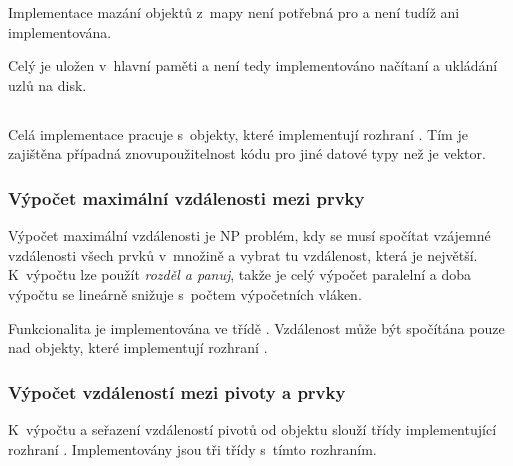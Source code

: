 Implementace mazání objektů z~mapy není potřebná pro \MIndex{} a není tudíž ani implementována.

Celý \BPTree{} je uložen v~hlavní paměti a není tedy implementováno načítaní a ukládání uzlů na disk.

\subsection{\MIndex}
Celá implementace \MIndex{} pracuje s~objekty, které implementují rozhraní . Tím je zajištěna případná znovupoužitelnost kódu pro jiné datové typy než je vektor.

\subsubsection{Výpočet maximální vzdálenosti mezi prvky}
Výpočet maximální vzdálenosti je NP problém, kdy se musí spočítat vzájemné vzdálenosti všech prvků v~množině a vybrat tu vzdálenost, která je největší. K~výpočtu lze použít \emph{rozděl a panuj}, takže je celý výpočet paralelní a doba výpočtu se lineárně snižuje s~počtem výpočetních vláken.

Funkcionalita je implementována ve třídě \linebreak {}.
Vzdálenost může být spočítána pouze nad objekty, které implementují rozhraní .


\subsubsection{Výpočet vzdáleností mezi pivoty a prvky}
K~výpočtu a seřazení vzdáleností pivotů od objektu slouží třídy implementující rozhraní . Implementovány jsou tři třídy s~tímto rozhraním.

